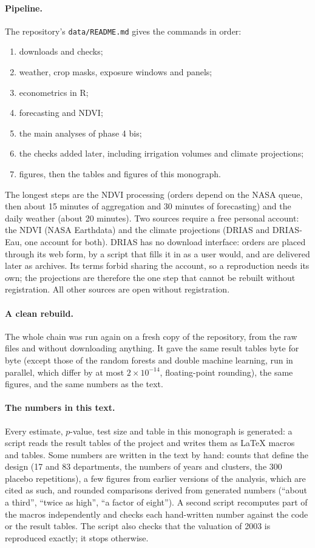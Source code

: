 \paragraph{Pipeline.} The repository's \texttt{data/README.md} gives the commands in order:
\begin{enumerate}
  \item downloads and checks;
  \item weather, crop masks, exposure windows and panels;
  \item econometrics in R;
  \item forecasting and NDVI;
  \item the main analyses of phase 4 bis;
  \item the checks added later, including irrigation volumes and climate projections;
  \item figures, then the tables and figures of this monograph.
\end{enumerate}
The longest steps are the NDVI processing (orders depend on the NASA queue, then about 15 minutes of aggregation and 30 minutes of forecasting) and the daily weather (about 20 minutes). Two sources require a free personal account: the NDVI (NASA Earthdata) and the climate projections (DRIAS and DRIAS-Eau, one account for both). DRIAS has no download interface: orders are placed through its web form, by a script that fills it in as a user would, and are delivered later as archives. Its terms forbid sharing the account, so a reproduction needs its own; the projections are therefore the one step that cannot be rebuilt without registration. All other sources are open without registration.

\paragraph{A clean rebuild.} The whole chain was run again on a fresh copy of the repository, from the raw files and without downloading anything. It gave the same result tables byte for byte (except those of the random forests and double machine learning, run in parallel, which differ by at most $2\times 10^{-14}$, floating-point rounding), the same figures, and the same numbers as the text.

\paragraph{The numbers in this text.} Every estimate, $p$-value, test size and table in this monograph is generated: a script reads the result tables of the project and writes them as \LaTeX{} macros and tables. Some numbers are written in the text by hand: counts that define the design (17 and 83 departments, the numbers of years and clusters, the 300 placebo repetitions), a few figures from earlier versions of the analysis, which are cited as such, and rounded comparisons derived from generated numbers (``about a third'', ``twice as high'', ``a factor of eight''). A second script recomputes part of the macros independently and checks each hand-written number against the code or the result tables. The script also checks that the valuation of 2003 is reproduced exactly; it stops otherwise.

